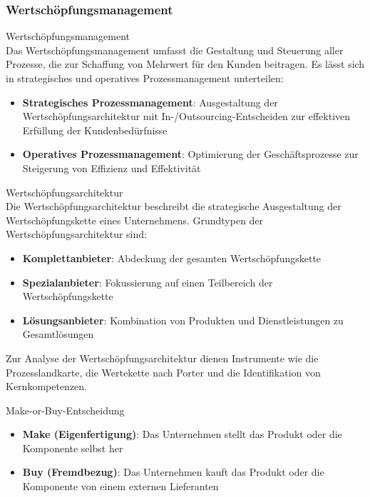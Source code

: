 \subsubsection{Wertschöpfungsmanagement}

\begin{definition}{Wertschöpfungsmanagement}\\
Das Wertschöpfungsmanagement umfasst die Gestaltung und Steuerung aller Prozesse, die zur Schaffung von Mehrwert für den Kunden beitragen. Es lässt sich in strategisches und operatives Prozessmanagement unterteilen:
\begin{itemize}
    \item \textbf{Strategisches Prozessmanagement}: Ausgestaltung der Wertschöpfungsarchitektur mit In-/Outsourcing-Entscheiden zur effektiven Erfüllung der Kundenbedürfnisse
    \item \textbf{Operatives Prozessmanagement}: Optimierung der Geschäftsprozesse zur Steigerung von Effizienz und Effektivität
\end{itemize}
\end{definition}

\begin{concept}{Wertschöpfungsarchitektur}\\
Die Wertschöpfungsarchitektur beschreibt die strategische Ausgestaltung der Wertschöpfungskette eines Unternehmens. Grundtypen der Wertschöpfungsarchitektur sind:
\begin{itemize}
    \item \textbf{Komplettanbieter}: Abdeckung der gesamten Wertschöpfungskette
    \item \textbf{Spezialanbieter}: Fokussierung auf einen Teilbereich der Wertschöpfungskette
    \item \textbf{Lösungsanbieter}: Kombination von Produkten und Dienstleistungen zu Gesamtlösungen
\end{itemize}

Zur Analyse der Wertschöpfungsarchitektur dienen Instrumente wie die Prozesslandkarte, die Wertekette nach Porter und die Identifikation von Kernkompetenzen.
\end{concept}



\begin{KR}{Make-or-Buy-Entscheidung}
\begin{itemize}
    \item \textbf{Make (Eigenfertigung)}: Das Unternehmen stellt das Produkt oder die Komponente selbst her
    \item \textbf{Buy (Fremdbezug)}: Das Unternehmen kauft das Produkt oder die Komponente von einem externen Lieferanten
\end{itemize}
\end{KR}


